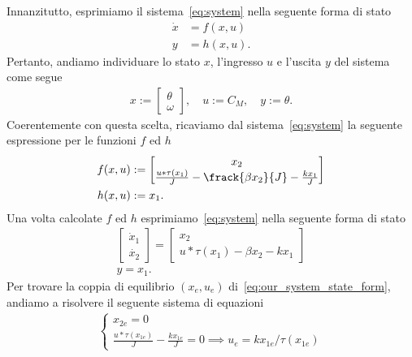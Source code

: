 \documentclass[a4paper, 11pt]{article}
\begin{document}
Innanzitutto, esprimiamo il sistema~\eqref{eq:system} nella seguente forma di stato
%
\begin{subequations}
\begin{align}\label{eq:state_form}
	\dot{x} &= f(x,u)
	\\
	y &= h(x,u).
\end{align}
\end{subequations}
%
Pertanto, andiamo individuare lo stato $x$, l'ingresso $u$ e l'uscita $y$ del sistema come segue 
%
\begin{align*}
	x := \begin{bmatrix}
		\theta \\
		\omega
	\end{bmatrix}, \quad u := C_M, \quad y := \theta.
\end{align*}
%
Coerentemente con questa scelta, ricaviamo dal sistema~\eqref{eq:system} la seguente espressione per le funzioni $f$ ed $h$
%
\begin{align*}
	f(x,u) &:= \begin{bmatrix}
		x_2 \\
		\frac{u*\tau(x_1)}{J}-\frack{\beta x_2}{J}- \frac{k x_1}{J}
	\end{bmatrix}
	\\
	h(x,u) &:= x_1.
\end{align*}
%
Una volta calcolate $f$ ed $h$ esprimiamo~\eqref{eq:system} nella seguente forma di stato
%
\begin{subequations}\label{eq:our_system_state_form}
\begin{gather*}
	\begin{bmatrix}
		\dot{x}_1
		\\
		\dot{x_2}
	\end{bmatrix} = \begin{bmatrix}
	x_2 \\
	u*\tau(x_1)-\beta x_2 - k x_1
	\end{bmatrix} \label{eq:state_form_1}
	\\ 
	y = x_1.
\end{gather*}
\end{subequations}
%
Per trovare la coppia di equilibrio $(x_e, u_e)$ di~\eqref{eq:our_system_state_form}, andiamo a risolvere il seguente sistema di equazioni
%
\begin{align}
	\begin{cases}
		x_{2e} = 0 \\
		\frac{u*\tau(x_{1e})}{J}- \frac{k x_{1e}}{J}= 0 \implies u_e = k x_{1e}/\tau(x_{1e})
	\end{cases}
\end{align}
\end{document}
